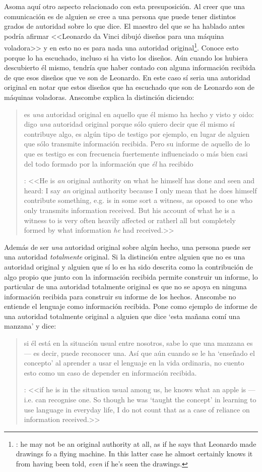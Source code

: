 Asoma aquí otro aspecto relacionado con esta presuposición. Al creer que una comunicación es de alguien se cree a una persona que puede tener distintos grados de autoridad sobre lo que dice. El maestro del que se ha hablado antes podría afirmar <<Leonardo da Vinci dibujó diseños para una máquina voladora>> y en esto no es para nada una autoridad original\footnote{\cite[Cf.~][6]{anscombe2008faith:tobelieve}: he may not be an original authority at all, as if he says that Leonardo made drawings fo a flying machine. In this latter case he almost certainly knows it from having been told, \emph{even} if he's seen the drawings.}. Conoce esto porque lo ha escuchado, incluso si ha visto los diseños. Aún cuando los hubiera descubierto él mismo, tendría que haber contado con alguna información recibida de que esos diseños que ve son de Leonardo. En este caso sí seria una autoridad original en notar que estos diseños que ha escuchado que son de Leonardo son de máquinas voladoras. Anscombe explica la distinción diciendo: \blockquote[{\cite[5]{anscombe2008faith:tobelieve}}: <<He is \emph{an} original authority on what he himself has done and seen and heard: I say \emph{an} original authority because I only mean that he does himself contribute something, e.g. is in some sort a witness, as oposed to one who only transmits information received. But his account of what he is a witness to is very often \textelp{} heavily affected or ratherl all but completely formed by what information \emph{he} had received.>>]{ es \emph{una} autoridad original en aquello que él mismo ha hecho y visto y oido: digo \emph{una} autoridad original porque sólo quiero decir que él mismo sí contribuye algo, es algún tipo de testigo por ejemplo, en lugar de alguien que sólo transmite información recibida. Pero su informe de aquello de lo que es testigo es con frecuencia \textelp{} fuertemente influenciado o más bien casi del todo formado por la información que \emph{él} ha recibido} Además de ser \emph{una} autoridad original sobre algún hecho, una persona puede ser una autoridad \emph{totalmente} original. Si la distinción entre alguien que no es una autoridad original y alguien que sí lo es ha sido descrita como la contribución de algo propio que junto con la información recibida permite construir un informe, lo particular de una autoridad totalmente original es que no se apoya en ninguna información recibida para construir su informe de los hechos. Anscombe no entiende el lenguaje como información recibida. Pone como ejemplo de informe de una autoridad totalmente original a alguien que dice `esta mañana comí una manzana' y dice: \blockquote[{\cite[6]{anscombe2008faith:tobelieve}}: <<if he is in the situation usual among us, he knows what an apple is --- i.e. can recognise one. So though he was `taught the concept' in learning to use language in everyday life, I do not count that as a case of reliance on information received.>>]{si él está en la situación usual entre nosotros, sabe lo que una manzana es --- es decir, puede reconocer una. Así que aún cuando se le ha `enseñado el concepto' al aprender a usar el lenguaje en la vida ordinaria, no cuento esto como un caso de depender en información recibida.}

